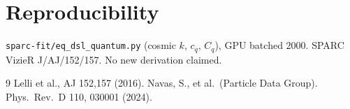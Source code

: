 \documentclass[11pt,a4paper]{article}
\begin{document}
\section*{Reproducibility}
{\tt sparc-fit/eq\_dsl\_quantum.py} (cosmic $k$, $c_{q}$, $C_{q}$), GPU batched $2000$. SPARC VizieR J/AJ/152/157. No new derivation claimed.

\begin{thebibliography}{9}
 Lelli et al., AJ 152,157 (2016).
 Navas, S., et al.\ (Particle Data Group). Phys.\ Rev.\ D 110, 030001 (2024).
\end{thebibliography}
\end{document}
